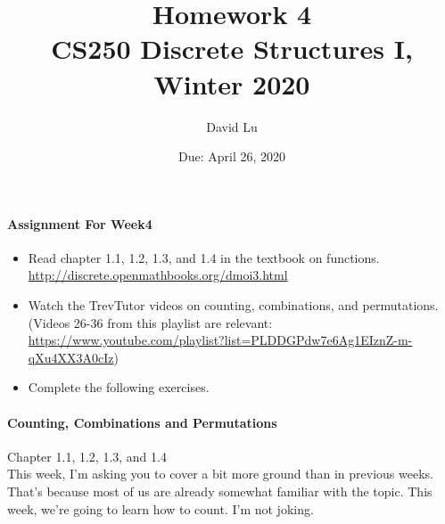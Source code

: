\documentclass[11pt]{article} %
\title{\bf Homework 4\\[1ex]
\rm\normalsize CS250 Discrete Structures I, Winter 2020 }
\date{\normalsize Due: April 26, 2020}
\author{\normalsize David Lu}
\begin{document}

	\vspace{-4cm}\maketitle %
	
	\begin{center}
	\end{center}
	
	\paragraph{Assignment For Week4}
	
	\begin{itemize}
		\item Read chapter 1.1, 1.2, 1.3, and 1.4 in the textbook on functions. \href{http://discrete.openmathbooks.org/dmoi3.html}{http://discrete.openmathbooks.org/dmoi3.html}
		\item Watch the TrevTutor videos on counting, combinations, and permutations. (Videos 26-36 from this playlist are relevant: \url{https://www.youtube.com/playlist?list=PLDDGPdw7e6Ag1EIznZ-m-qXu4XX3A0cIz})
		\item Complete the following exercises.
	\end{itemize}

	\paragraph{Counting, Combinations and Permutations} Chapter 1.1, 1.2, 1.3, and 1.4\\
	
	This week, I'm asking you to cover a bit more ground than in previous weeks. That's because most of us are already somewhat familiar with the topic. This week, we're going to learn how to count. I'm not joking. \\
	
\end{document}
